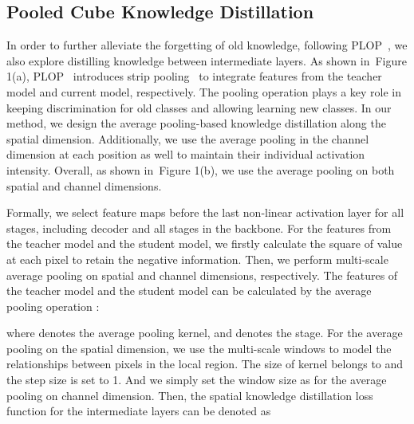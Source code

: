 \documentclass[10pt,twocolumn,letterpaper]{article}
\newcommand{\figref}[1]{Figure 1}\newcommand{\tabref}[1]{Table 1}\newcommand{\secref}[1]{Section 1}
\newcommand{\figref}[1]{Fig.~\ref{#1}}\newcommand{\tabref}[1]{Tab.~\ref{#1}}\newcommand{\secref}[1]{Sec.~\ref{#1}}
\begin{document}
\subsection{Pooled Cube Knowledge Distillation}











In order to further alleviate the forgetting of old knowledge,
following PLOP~\cite{plop}, we also explore  distilling knowledge between intermediate layers.
As shown in~\figref{fig:kd}(a),
PLOP~\cite{plop} introduces strip pooling~\cite{hou2020strip} to integrate features from the teacher model and current model, respectively.
The pooling operation plays a key role in keeping discrimination for old classes and allowing learning new classes.
In our method,
we design the average pooling-based knowledge distillation along the spatial dimension.
Additionally, we use the average pooling in the channel dimension at each position as well to maintain their individual activation intensity.
Overall, as shown in~\figref{fig:kd}(b),
we use the average pooling on both spatial and channel dimensions.















Formally,
we select feature maps  before the last non-linear activation layer for all  stages,
including decoder and all stages in the backbone.
For the features from the teacher model and the student model,
we firstly calculate the square of value at each pixel to retain the negative information.
Then,
we perform multi-scale average pooling on spatial
and channel dimensions, respectively.
The features  of the teacher model and the student model can be calculated by the average pooling operation :

where  denotes the  average pooling kernel,
and  denotes the  stage.
For the average pooling on the spatial dimension,
we use the multi-scale windows to model the relationships between pixels in the local region.
The size of kernel  belongs to  and the step size is set to 1.
And we simply set the window size as  for the average pooling on channel dimension.
Then,
the spatial knowledge distillation loss function  for the intermediate layers can be denoted as
\end{document}
